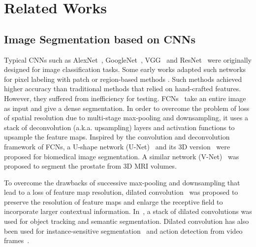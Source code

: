 \documentclass[10pt,journal,compsoc]{IEEEtran}
\begin{document}


\section{Related Works}
\subsection{Image Segmentation based on CNNs}
Typical CNNs such as AlexNet~\cite{Krizhevsky2012}, GoogleNet~\cite{Szegedy2015}, VGG~\cite{Simonyan2015} and ResNet~\cite{He2015res} were originally designed for image classification tasks. Some early works adapted such networks for pixel labeling with patch or region-based methods \cite{Havaei2016, Girshick2014}. 
Such methods achieved higher accuracy than traditional methods that relied on hand-crafted features. However, they suffered from inefficiency for testing. FCNs~\cite{Long2014} take an entire image as input and give a dense segmentation. In order to overcome the problem of loss of spatial resolution due to multi-stage max-pooling and downsampling, it uses a stack of deconvolution (a.k.a. upsampling) layers and activation functions to upsample the feature maps. %
Inspired by the convolution and deconvolution framework of FCNs, a U-shape network (U-Net)~\cite{Hefny2015a} and its 3D version~\cite{Abdulkadir2016} were proposed %
for biomedical image segmentation. A similar network (V-Net)~\cite{Milletari2016} was proposed  to segment the prostate from 3D MRI volumes.

To overcome the drawbacks of successive max-pooling and downsampling that lead to a loss of feature map resolution, dilated convolution~\cite{Chen2015iclr, Onvolutions2016} was proposed to preserve the resolution of feature maps and enlarge the receptive field to incorporate larger contextual information. In~\cite{Ondruska2016}, a stack of dilated convolutions was used for object tracking and semantic segmentation. Dilated convolution has also been used for instance-sensitive segmentation~\cite{Dai2016} and action detection from video frames~\cite{Lea2016}.
\end{document}
